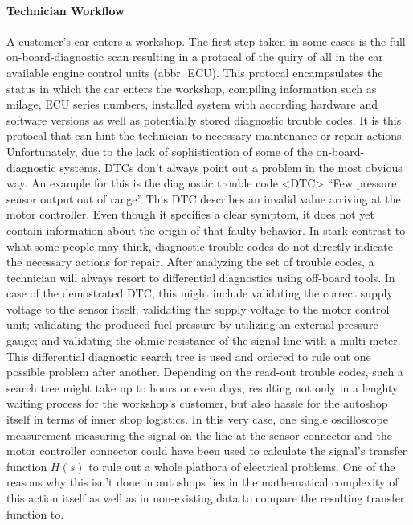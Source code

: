 \paragraph{Technician Workflow}
A customer's car enters a workshop. 
The first step taken in some cases is the full on-board-diagnostic scan resulting in a protocal of the quiry of all in the car available engine control units (abbr. ECU). 
This protocal encampsulates the status in which the car enters the workshop, compiling information such as milage, ECU series numbers, installed system with according hardware and software versions as well as potentially stored diagnostic trouble codes.
It is this protocal that can hint the technician to necessary maintenance or repair actions.
Unfortunately, due to the lack of sophistication of some of the on-board-diagnostic systems, DTCs don't always point out a problem in the most obvious way. 
An example for this is the diagnostic trouble code <DTC>
``Few pressure sensor output out of range'' This DTC describes an invalid value arriving at the motor controller.
Even though it specifies a clear symptom, it does not yet contain information about the origin of that faulty behavior.
In stark contrast to what some people may think, diagnostic trouble codes do not directly indicate the necessary actions for repair.
After analyzing the set of trouble codes, a technician will always resort to differential diagnostics using off-board tools.
In case of the demostrated DTC, this might include validating the correct supply voltage to the sensor itself; 
validating the supply voltage to the motor control unit; validating the produced fuel pressure by utilizing an external pressure gauge; and validating the ohmic resistance of the signal line with a multi meter.
This differential diagnostic search tree is used and ordered to rule out one possible problem after another.
Depending on the read-out trouble codes, such a search tree might take up to hours or even days, resulting not only in a lenghty waiting process for the workshop's customer, but also hassle for the autoshop itself in terms of inner shop logistics.
In this very case, one single oscilloscope measurement measuring the signal on the line at the sensor connector and the motor controller connector could have been used to calculate the signal's transfer function $H(s)$ to rule out a whole plathora of electrical problems.
One of the reasons why this isn't done in autoshops lies in the mathematical complexity of this action itself as well as in non-existing data to compare the resulting transfer function to.
